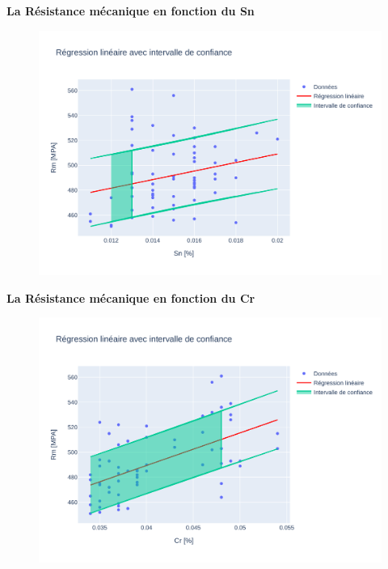 \documentclass[12pt]{article}
\begin{document}
\textbf{La Résistance mécanique en fonction du Sn} 
\begin{figure}[H]
\includegraphics[width=\textwidth]{Images/Statistique/Regression_Sn_Rm.pdf} 
\end{figure}



\textbf{La Résistance mécanique en fonction du Cr} 
\begin{figure}[H]
\includegraphics[width=\textwidth]{Images/Statistique/Regression_Cr_Rm.pdf} 
\end{figure}
\end{document}

